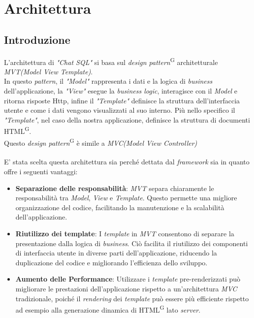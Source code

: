 \documentclass[5pt]{article}
\begin{document}
	\section{Architettura}
	
	\subsection{Introduzione}
L'architettura di \textit{"Chat SQL"} si basa sul \textit{design pattern}\textsuperscript{G} architetturale \textit{MVT(Model View Template)}.\\

In questo \textit{pattern}, il \textit{"Model"} rappresenta i dati e la logica di \textit{business} dell'applicazione, la \textit{"View"} esegue la \textit{business logic}, interagisce con il \textit{Model} e ritorna risposte Http, infine  il \textit{"Template"} definisce la struttura dell'interfaccia utente e come i dati vengono visualizzati al suo interno. Più nello specifico il \textit{"Template"}, nel caso della nostra applicazione, definisce la struttura di documenti HTML\textsuperscript{G}.\\

Questo \textit{design pattern}\textsuperscript{G} è simile a \textit{MVC(Model View Controller)} \\\\
E' stata scelta questa architettura sia perché dettata dal \textit{framework} sia in quanto offre i seguenti vantaggi:
\begin{itemize}
    \item \textbf{Separazione delle responsabilità}: \textit{MVT} separa chiaramente le responsabilità tra \textit{Model}, \textit{View} e \textit{Template}. Questo permette una migliore organizzazione del codice, facilitando la manutenzione e la scalabilità dell'applicazione.

    \item \textbf{Riutilizzo dei template}: I \textit{template} in \textit{MVT} consentono di separare la presentazione dalla logica di \textit{business}. Ciò facilita il riutilizzo dei componenti di interfaccia utente in diverse parti dell'applicazione, riducendo la duplicazione del codice e migliorando l'efficienza dello sviluppo.

    \item \textbf{Aumento delle Performance}: Utilizzare i \textit{template} pre-renderizzati può migliorare le prestazioni dell'applicazione rispetto a un'architettura \textit{MVC} tradizionale, poiché il \textit{rendering} dei \textit{template} può essere più efficiente rispetto ad esempio alla generazione dinamica di HTML\textsuperscript{G} lato \textit{server}.

\end{itemize}
	
\end{document}
